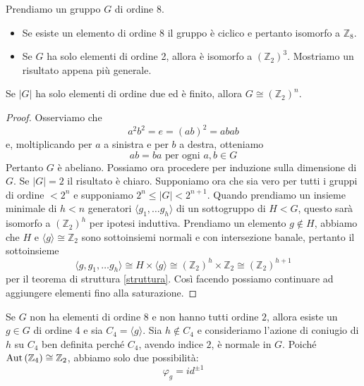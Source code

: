 \begin{multicols}{2}
	Prendiamo un gruppo $ G $ di ordine 8.
\begin{itemize}
	\item Se esiste un elemento di ordine 8 il gruppo è ciclico e pertanto isomorfo a $ \mathbb{Z}_8 $.
	\item Se $ G $ ha solo elementi di ordine 2, allora è isomorfo a $ \left(\mathbb{Z}_2\right)^3 $. Mostriamo un risultato appena più generale. 
\end{itemize}
\begin{theorem}
	Se $ |G| $ ha solo elementi di ordine due ed è finito, allora $ G \cong \left(\mathbb{Z}_2\right)^n $.
\end{theorem}
\begin{proof}
	Osserviamo che $$  a^2b^2 = e = (ab)^2 = abab  $$ e, moltiplicando per $ a $ a sinistra e per $ b $ a destra, otteniamo $$  ab = ba \text{ per ogni } a, b \in G  $$ Pertanto $ G $ è abeliano. Possiamo ora procedere per induzione sulla dimensione di $ G $. Se $ |G| = 2 $ il risultato è chiaro. Supponiamo ora che sia vero per tutti i gruppi di ordine $ < 2^n $ e supponiamo $ 2^ n \leq |G| < 2^{n+1} $. Quando prendiamo un insieme minimale di $ h < n $ generatori $ \langle g_1, \dots g_h \rangle $ di un sottogruppo di $ H < G $, questo sarà isomorfo a $ \left(\mathbb{Z}_2\right)^h $ per ipotesi induttiva. Prendiamo un elemento $ g \notin H$, abbiamo che $ H $ e $ \langle g \rangle \cong \mathbb{Z}_2 $ sono sottoinsiemi normali e con intersezione banale, pertanto il sottoinsieme \[ \langle g, g_1, \dots g_h \rangle \cong H \times\langle g \rangle \cong \left(\mathbb{Z}_2\right)^h \times \mathbb{Z}_2 \cong \left(\mathbb{Z}_2\right)^{h+1} \]
	per il teorema di struttura \ref{struttura}.
	Così facendo possiamo continuare ad aggiungere elementi fino alla saturazione.
\end{proof}
Se $ G $ non ha elementi di ordine $ 8 $ e non hanno tutti ordine $ 2 $, allora esiste un $ g \in G $ di ordine 4 e sia $ C_4 = \langle g \rangle $. Sia $ h \notin C_4 $ e consideriamo l'azione di coniugio di $ h $ su $ C_4 $
ben definita perché $ C_4 $, avendo indice $ 2 $, è normale in $ G $. Poiché $ \mathrm{Aut}\left( \mathbb{Z}_4 \right) \cong \mathbb{Z}_2 $, abbiamo solo due possibilità: $$  \varphi_g =  id^{\pm 1}  $$


\end{multicols}
